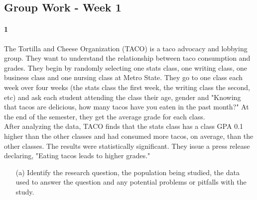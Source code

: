 \documentclass{article}
\begin{document}
\begin{flushleft}
\section*{Group Work - Week 1}
\paragraph{1} The Tortilla and Cheese Organization (TACO) is a taco advocacy and lobbying group. They want to understand the relationship between taco consumption and grades. They begin by randomly selecting one stats class, one writing class, one business class and one nursing class at Metro State. They go to one class each week over four weeks (the stats class the first week, the writing class the second, etc) and ask each student attending the class their age, gender and "Knowing that tacos are delicious, how many tacos have you eaten in the past month?" At the end of the semester, they get the average grade for each class.\\
\medskip
After analyzing the data, TACO finds that the stats class has a class GPA 0.1 higher than the other classes and had consumed more tacos, on average, than the other classes. The results were statistically significant. They issue a press release declaring, "Eating tacos leads to higher grades."

\begin{itemize}
\item [(a)] Identify the research question, the population being studied, the data used to answer the question and any potential problems or pitfalls with the study.\\
\medskip
{}\\
\medskip{}\\
\medskip{}\\
\medskip{}
\vspace{.25in}


\end{itemize}
\end{flushleft}
\end{document}
